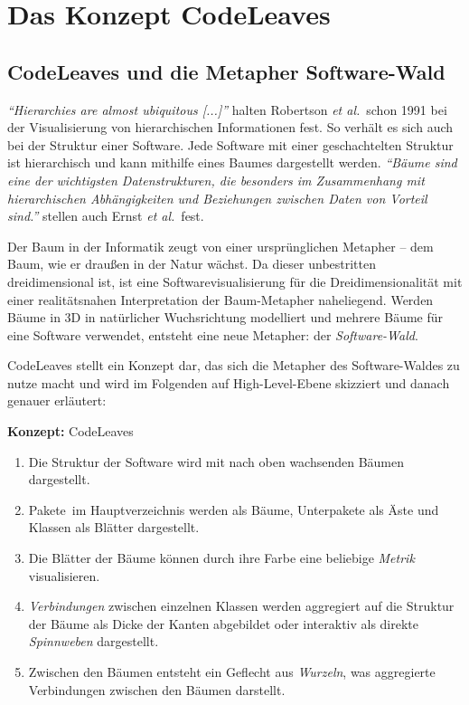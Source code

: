 \chapter{Das Konzept CodeLeaves}
\label{ch:concept}

\section{CodeLeaves und die Metapher Software-Wald}
\label{sec:idea}

\emph{``Hierarchies are almost ubiquitous [...]''} \cite{robertson1991cone} halten Robertson \emph{et al.}\ schon 1991 bei der Visualisierung von hierarchischen Informationen fest. So verhält es sich auch bei der Struktur einer Software. Jede Software mit einer geschachtelten Struktur ist hierarchisch und kann mithilfe eines Baumes dargestellt werden. \emph{"`Bäume sind eine der wichtigsten Datenstrukturen, die besonders im Zusammenhang mit hierarchischen Abhängigkeiten und Beziehungen zwischen Daten von Vorteil sind."'} \cite{ernst2016grundkurs} stellen auch Ernst \emph{et al.}\ fest.

Der Baum in der Informatik zeugt von einer ursprünglichen Metapher -- dem Baum, wie er draußen in der Natur wächst. Da dieser unbestritten dreidimensional ist, ist eine Softwarevisualisierung für die Dreidimensionalität mit einer realitätsnahen Interpretation der Baum-Metapher naheliegend. Werden Bäume in 3D in natürlicher Wuchsrichtung modelliert und mehrere Bäume für eine Software verwendet, entsteht eine neue Metapher: der \emph{Software-Wald}.

CodeLeaves stellt ein Konzept dar, das sich die Metapher des Software-Waldes zu nutze macht und wird im Folgenden auf High-Level-Ebene skizziert und danach genauer erläutert:

\begin{titlebox}{\textbf{Konzept:} CodeLeaves}
  \begin{enumerate}[leftmargin=1em]
    \item Die Struktur der Software wird mit nach oben wachsenden Bäumen dargestellt.
    \item Pakete\ im Hauptverzeichnis werden als Bäume, Unterpakete als Äste und Klassen als Blätter dargestellt.
    \item Die Blätter der Bäume können durch ihre Farbe eine beliebige \textit{Metrik}\footnotemark[1]{} visualisieren.
    \item \textit{Verbindungen}\footnotemark[2]{} zwischen einzelnen Klassen werden aggregiert auf die Struktur der Bäume als Dicke der Kanten abgebildet oder interaktiv als direkte \emph{Spinnweben} dargestellt.
    \item Zwischen den Bäumen entsteht ein Geflecht aus \emph{Wurzeln}, was aggregierte Verbindungen zwischen den Bäumen darstellt.
  \end{enumerate}
\end{titlebox}

